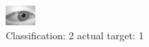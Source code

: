 \begin{figure}[h!]
\begin{center}
\includegraphics[width=0.60\columnwidth]{figures/ID2779_class_2_target_1.png}
\end{center}
\caption{ Classification: 2 actual target: 1}
\label{fig:ID2779_class_2_target_1}
\end{figure}

